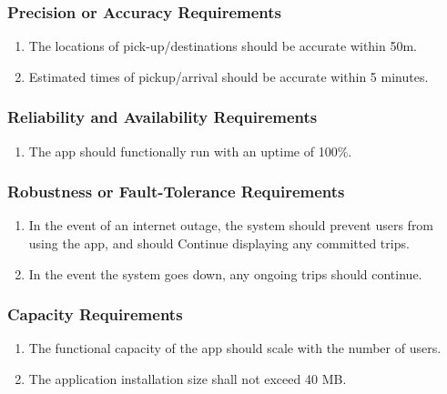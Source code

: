 \documentclass[]{article}
\begin{document}
\subsubsection{Precision or Accuracy Requirements}
\label{ssub:precision_or_accuracy_requirements}
\begin{enumerate}[{PR-PA}1. ]
	\item The locations of pick-up/destinations should be accurate within 50m.
	\item Estimated times of pickup/arrival should be accurate within 5 minutes.
\end{enumerate}

\subsubsection{Reliability and Availability Requirements}
\label{ssub:reliability_and_availability_requirements}
\begin{enumerate}[{PR-RA}1. ]
	\item The app should functionally run with an uptime of 100\%.
\end{enumerate}

\subsubsection{Robustness or Fault-Tolerance Requirements}
\label{ssub:robustness_or_fault_tolerance_requirements}
\begin{enumerate}[{PR-RFT}1. ]
	\item In the event of an internet outage, the system should prevent users from using the app, and should Continue displaying any committed trips.
	\item In the event the system goes down, any ongoing trips should continue.
\end{enumerate}

\subsubsection{Capacity Requirements}
\label{ssub:capacity_requirements}
\begin{enumerate}[{PR-C}1. ]
	\item The functional capacity of the app should scale with the number of users.
	\item The application installation size shall not exceed 40 MB.
\end{enumerate}
\end{document}
